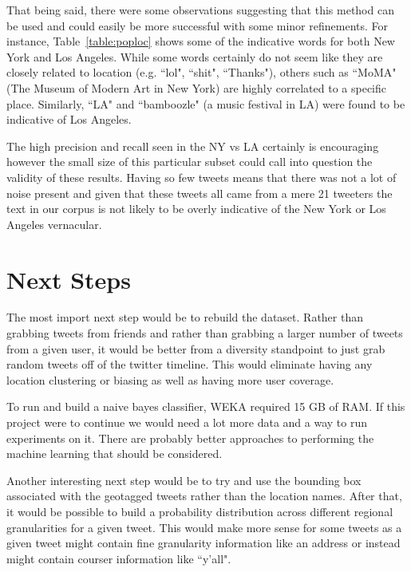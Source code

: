 \documentclass[12pt]{article}
\begin{document}
That being said, there were some observations suggesting that this method can be used and could easily be more successful with some minor refinements.  For instance, Table~\ref{table:poploc} shows some of the indicative words for both New York and Los Angeles.  While some words certainly do not seem like they are closely related to location (e.g. ``lol", ``shit", ``Thanks"), others such as ``MoMA" (The Museum of Modern Art in New York) are highly correlated to a specific place.  Similarly, ``LA" and ``bamboozle" (a music festival in LA) were found to be indicative of Los Angeles.

The high precision and recall seen in the NY vs LA certainly is encouraging however the small size of this particular subset could call into question the validity of these results.  Having so few tweets means that there was not a lot of noise present and given that these tweets all came from a mere 21 tweeters the text in our corpus is not likely to be overly indicative of the New York or Los Angeles vernacular.

\section*{Next Steps}
The most import next step would be to rebuild the dataset.  Rather than grabbing tweets from friends and rather than grabbing a larger number of tweets from a given user, it would be better from a diversity standpoint to just grab random tweets off of the twitter timeline.  This would eliminate having any location clustering or biasing as well as having more user coverage.

To run and build a naive bayes classifier, WEKA required 15 GB of RAM. If this project were to continue we would need a lot more data and a way to run experiments on it. There are probably better approaches to performing the machine learning that should be considered. 

Another interesting next step would be to try and use the bounding box associated with the geotagged tweets rather than the location names.  After that, it would be possible to build a probability distribution across different regional granularities for a given tweet.  This would make more sense for some tweets as a given tweet might contain fine granularity information like an address or instead might contain courser information like ``y'all".  



\end{document}

